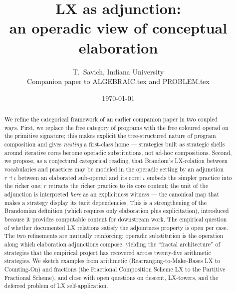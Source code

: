 \documentclass[11pt]{article}
\title{LX as adjunction:\\
       an operadic view of conceptual elaboration}
\author{T.\ Savich, Indiana University\\
\small Companion paper to ALGEBRAIC.tex and PROBLEM.tex}
\date{\today}
\begin{document}
\maketitle

\noindent{}
\bigskip

\begin{abstract}
We refine the categorical framework of an earlier companion paper in
two coupled ways. First, we replace the free category of programs with
the free coloured operad on the primitive signature; this makes
explicit the tree-structured nature of program composition and gives
\emph{nesting} a first-class home — strategies built as strategic
shells around iterative cores become operadic substitutions, not
ad-hoc compositions. Second, we propose, as a conjectural categorical
reading, that Brandom's LX-relation between vocabularies and practices
may be modeled in the operadic setting by an adjunction $r \dashv \iota$
between an elaborated sub-operad and its core: $\iota$ embeds the
simpler practice into the richer one; $r$ retracts the richer practice
to its core content; the unit of the adjunction is interpreted
\emph{here} as an explicitness witness — the canonical map that makes
a strategy display its tacit dependencies. This is a strengthening of
the Brandomian definition (which requires only elaboration plus
explicitation), introduced because it provides computable content for
downstream work. The empirical question of whether documented LX
relations satisfy the adjointness property is open per case.
The two refinements are mutually reinforcing: operadic substitution is
the operation along which elaboration adjunctions compose, yielding the
``fractal architecture'' of strategies that the empirical project has
recovered across twenty-five arithmetic strategies. We sketch examples
from arithmetic (Rearranging-to-Make-Bases LX to Counting-On) and
fractions (the Fractional Composition Scheme LX to the Partitive
Fractional Scheme), and close with open questions on descent,
LX-towers, and the deferred problem of LX self-application.
\end{abstract}
\end{document}
